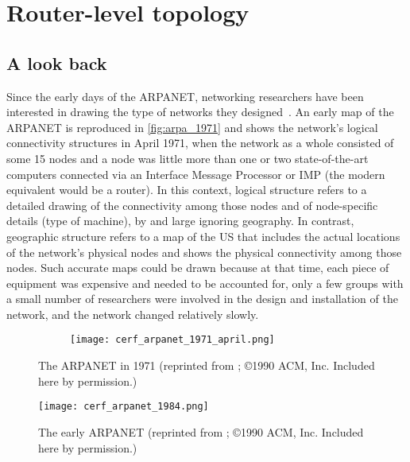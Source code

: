 \clearpage
\section{Router-level topology}
\label{sec:router}

\subsection{A look back}
\label{sec:router_hist}

Since the early days of the ARPANET, networking researchers have been
interested in drawing the type of networks they
designed~\cite{heart78:_arpanet}.  An early map of the ARPANET is
reproduced in \autoref{fig:arpa_1971} and shows the network's logical
connectivity structures in April 1971, when the network as a whole
consisted of some 15 nodes and a node was little more than one or two
state-of-the-art computers connected via an Interface Message
Processor or IMP (the modern equivalent would be a router).  In this
context, logical structure refers to a detailed drawing of the
connectivity among those nodes and of node-specific details (\eg type
of machine), by and large ignoring geography.  In contrast, geographic
structure refers to a map of the US that includes the actual locations
of the network's physical nodes and shows the physical connectivity
among those nodes. Such accurate maps could be drawn because at that
time, each piece of equipment was expensive and needed to be accounted
for, only a few groups with a small number of researchers were
involved in the design and installation of the network, and the
network changed relatively slowly.

\begin{figure}[thbp]
  \begin{center}
    \begin{subfigure}[b]{0.75\textwidth} \centering
      \texttt{[image: cerf\_arpanet\_1971\_april.png]}
    \end{subfigure}
    \caption{The ARPANET in 1971 (reprinted from
      \cite{cerf90:_selected_maps}; \copyright 1990 ACM, Inc. Included here by permission.)
      \label{fig:arpa_1971}}
  \end{center}
\end{figure}


\begin{figure}[thbp]
  \begin{center}
    \texttt{[image: cerf\_arpanet\_1984.png]}
    \caption{The early ARPANET  (reprinted from
      \cite{cerf90:_selected_maps}; \copyright 1990 ACM, Inc. Included here by permission.)
      \label{fig:arpa_1984}}
  \end{center}
\end{figure}

